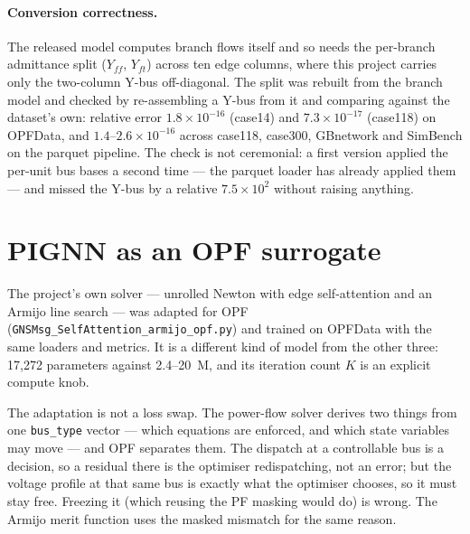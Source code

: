 \documentclass[10pt]{article}
\begin{document}
\paragraph{Conversion correctness.} The released model computes branch flows
itself and so needs the per-branch admittance split (\(Y_{ff}\), \(Y_{ft}\))
across ten edge columns, where this project carries only the two-column Y-bus
off-diagonal. The split was rebuilt from the branch model and checked by
re-assembling a Y-bus from it and comparing against the dataset's own: relative
error \(1.8\times10^{-16}\) (case14) and \(7.3\times10^{-17}\) (case118) on
OPFData, and \(1.4\)--\(2.6\times10^{-16}\) across case118, case300, GBnetwork
and SimBench on the parquet pipeline. The check is not ceremonial: a first
version applied the per-unit bus bases a second time --- the parquet loader has
already applied them --- and missed the Y-bus by a relative \(7.5\times10^{2}\)
without raising anything.

\section{PIGNN as an OPF surrogate}
\label{sec:pignn}

The project's own solver --- unrolled Newton with edge self-attention and an
Armijo line search --- was adapted for OPF
(\texttt{GNSMsg\_SelfAttention\_armijo\_opf.py}) and trained on OPFData with
the same loaders and metrics. It is a different kind of model from the other
three: 17{,}272 parameters against 2.4--20~M, and its iteration count \(K\) is
an explicit compute knob.

The adaptation is not a loss swap. The power-flow solver derives two things
from one \texttt{bus\_type} vector --- which equations are enforced, and which
state variables may move --- and OPF separates them. The dispatch at a
controllable bus is a decision, so a residual there is the optimiser
redispatching, not an error; but the voltage profile at that same bus is
exactly what the optimiser chooses, so it must stay free. Freezing it (which
reusing the PF masking would do) is wrong. The Armijo merit function uses the
masked mismatch for the same reason.
\end{document}
